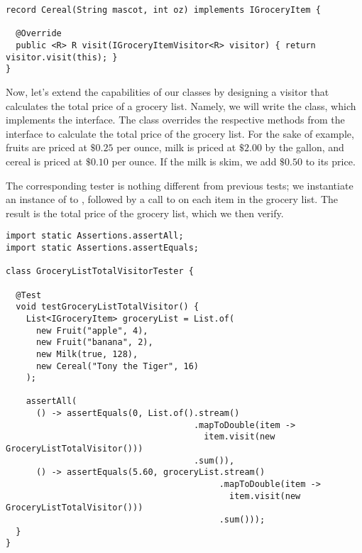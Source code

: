 \begin{cl}[]{}
\begin{lstlisting}[language=MyJava]
record Cereal(String mascot, int oz) implements IGroceryItem {
    
  @Override
  public <R> R visit(IGroceryItemVisitor<R> visitor) { return visitor.visit(this); }
}
\end{lstlisting}
\end{cl}

Now, let's extend the capabilities of our classes by designing a visitor that calculates the total price of a grocery list. Namely, we will write the  class, which implements the  interface. The  class overrides the respective methods from the  interface to calculate the total price of the grocery list. For the sake of example, fruits are priced at $\$0.25$ per ounce, milk is priced at $\$2.00$ by the gallon, and cereal is priced at $\$0.10$ per ounce. If the milk is skim, we add $\$0.50$ to its price.

The corresponding tester is nothing different from previous tests; we instantiate an instance of  to , followed by a call to  on each item in the grocery list. The result is the total price of the grocery list, which we then verify.

\begin{cl}[]{}
\begin{lstlisting}[language=MyJava]
import static Assertions.assertAll;
import static Assertions.assertEquals;

class GroceryListTotalVisitorTester {

  @Test
  void testGroceryListTotalVisitor() {
    List<IGroceryItem> groceryList = List.of(
      new Fruit("apple", 4),
      new Fruit("banana", 2),
      new Milk(true, 128),
      new Cereal("Tony the Tiger", 16)
    );

    assertAll(
      () -> assertEquals(0, List.of().stream()
                                     .mapToDouble(item -> 
                                       item.visit(new GroceryListTotalVisitor()))
                                     .sum()),
      () -> assertEquals(5.60, groceryList.stream()
                                          .mapToDouble(item -> 
                                            item.visit(new GroceryListTotalVisitor()))
                                          .sum()));
  }
}
\end{lstlisting}
\end{cl}

